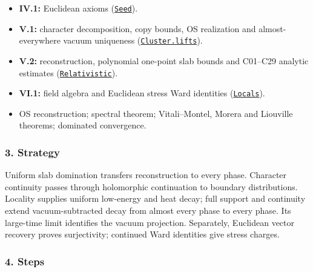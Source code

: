 \documentclass[
  letterpaper,
  11pt]{article}
\providecommand{\tightlist}{%
  \setlength{\itemsep}{0pt}\setlength{\parskip}{0pt}}
\begin{document}
\begin{itemize}
\tightlist
\item
  \textbf{IV.1:} Euclidean axioms
  (\href{https://github.com/yang-mills-group/OpenAI-YM-20261028/blob/3456e5e75cf8d4cd558955a5c7638fba2d68f464/YM/Spec/Closed.lean\#L20-L26}{\texttt{Seed}}).
\item
  \textbf{V.1:} character decomposition, copy bounds, OS realization and
  almost-everywhere vacuum uniqueness
  (\href{https://github.com/yang-mills-group/OpenAI-YM-20261028/blob/3456e5e75cf8d4cd558955a5c7638fba2d68f464/YM/Phase/Unique.lean\#L91-L110}{\texttt{Cluster.lifts}}).
\item
  \textbf{V.2:} reconstruction, polynomial one-point slab bounds and
  C01--C29 analytic estimates
  (\href{https://github.com/yang-mills-group/OpenAI-YM-20261028/blob/3456e5e75cf8d4cd558955a5c7638fba2d68f464/YM/Spec/Closed.lean\#L50-L54}{\texttt{Relativistic}}).
\item
  \textbf{VI.1:} field algebra and Euclidean stress Ward identities
  (\href{https://github.com/yang-mills-group/OpenAI-YM-20261028/blob/3456e5e75cf8d4cd558955a5c7638fba2d68f464/YM/Spec/Closed.lean\#L34-L43}{\texttt{Locals}}).
\item
  OS reconstruction; spectral theorem; Vitali--Montel, Morera and
  Liouville theorems; dominated convergence.
\end{itemize}

\subsubsection{3. Strategy}\label{strategy-22}

Uniform slab domination transfers reconstruction to every phase.
Character continuity passes through holomorphic continuation to boundary
distributions. Locality supplies uniform low-energy and heat decay; full
support and continuity extend vacuum-subtracted decay from almost every
phase to every phase. Its large-time limit identifies the vacuum
projection. Separately, Euclidean vector recovery proves surjectivity;
continued Ward identities give stress charges.

\subsubsection{4. Steps}\label{steps-22}
\end{document}
